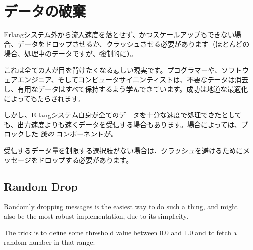 \section{データの破棄}

Erlangシステム外から流入速度を落とせず、かつスケールアップもできない場合、データをドロップさせるか、クラッシュさせる必要があります（ほとんどの場合、処理中のデータですが、強制的に）。

これは全ての人が目を背けたくなる悲しい現実です。プログラマーや、ソフトウェアエンジニア、そしてコンピュータサイエンティストは、不要なデータは消去し、有用なデータはすべて保持するよう学んできています。成功は地道な最適化によってもたらされます。

しかし、Erlangシステム自身が全てのデータを十分な速度で処理できたとしても、出力速度よりも速くデータを受信する場合もあります。場合によっては、ブロックした \emph{後の} コンポーネントが。

受信するデータ量を制限する選択肢がない場合は、クラッシュを避けるためにメッセージをドロップする必要があります。

\subsection{Random Drop}

Randomly dropping messages is the easiest way to do such a thing, and might also be the most robust implementation, due to its simplicity.

The trick is to define some threshold value between 0.0 and 1.0 and to fetch a random number in that range:

